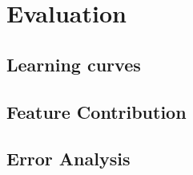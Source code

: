 \chapter{Evaluation}
\label{sec:Evaluation}

\section{Learning curves}

\section{Feature Contribution}

\section{Error Analysis}